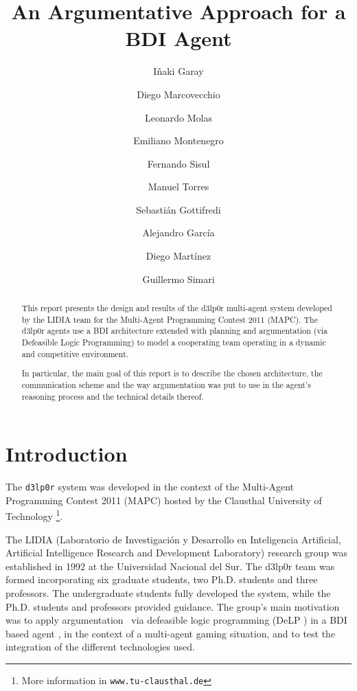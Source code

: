\documentclass{llncs2e/llncs}
\title{An Argumentative Approach for a BDI Agent}
\author{I\~{n}aki Garay \and      %
        Diego Marcovecchio \and   %
        Leonardo Molas \and       %
        Emiliano Montenegro \and  %
        Fernando Sisul \and       %
        Manuel Torres \and        %
        Sebastián Gottifredi \and %
        Alejandro García \and     %
        Diego Martínez \and       %
        Guillermo Simari          %
        }
\institute{Universidad Nacional del Sur \\\email{\{igarai,diegomarcov,leos.molas,%
emm.montenegro,fsisul,jmtorresluc\}@gmail.com,\\\{sg,ajg,dcm,grs\}%
@cs.uns.edu.ar}}
\begin{document}
\maketitle

\begin{abstract}
    This report presents the design and results of the d3lp0r multi-agent system 
    developed by the LIDIA team for the Multi-Agent Programming Contest 2011 (MAPC).
    The d3lp0r agents use a BDI architecture extended with planning and 
    argumentation (via Defeasible Logic Programming) to model a cooperating team 
    operating in a dynamic and competitive environment.

    In particular, the main goal of this report is to describe the chosen 
    architecture, the communication scheme and the way argumentation was put to 
    use in the agent's reasoning process and the technical details thereof.
\end{abstract}

\section{Introduction}

    The \texttt{d3lp0r} system was developed in the context of the Multi-Agent
    Programming Contest 2011 (MAPC) \cite{BehrensAMAI2010b} hosted by the
    Clausthal University of Technology \footnote{More information in
    \texttt{www.tu-clausthal.de}}.

    The LIDIA (Laboratorio de Investigación y Desarrollo en Inteligencia
    Artificial, Artificial Intelligence Research and Development Laboratory)
    research group was established in 1992 at the Universidad Nacional del Sur.
    The d3lp0r team was formed incorporating six graduate students, two Ph.D.
    students and three professors. The undergraduate students fully developed
    the system, while the Ph.D. students and professors provided guidance. The
    group's main motivation was to apply argumentation \cite{Prakken:1997}
    \cite{Rahwan:2009} \cite{Bench-Capon:2007}\ via defeasible logic programming
    (DeLP \cite{Garcia:2004a}) in a BDI based agent \cite{Amgoud:2008}, in the
    context of a multi-agent gaming situation, and to test the integration of
    the different technologies used.

%
\end{document}
